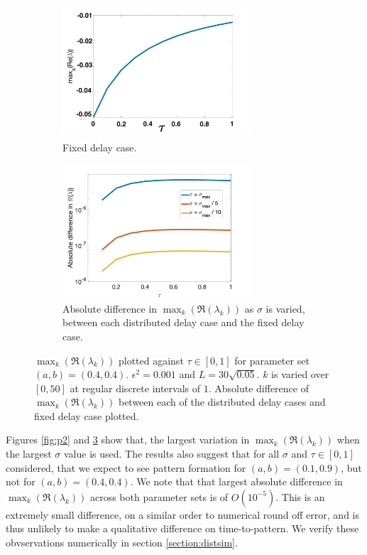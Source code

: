 \begin{figure}[H]
    \centering
    \begin{subfigure}[b]{0.45\textwidth}
        \centering
        \includegraphics[width=7cm,height=5cm]{p3fixed.png}
        \caption{Fixed delay case.}
        \label{}
    \end{subfigure}
    \hfill
    \begin{subfigure}[b]{0.45\textwidth}
        \centering
        \includegraphics[width=7cm,height=5cm]{dispdiff2.png}
        \caption{Absolute difference in $\max_k(\Re(\lambda_k))$ as $\sigma$ is varied, between each distributed delay case and the fixed delay case.}
        \label{}
    \end{subfigure}
    \caption{$\max_k(\Re(\lambda_k))$ plotted against $\tau\in[0,1]$ for parameter set $(a,b)=(0.4,0.4)$. $\epsilon^2=0.001$ and $L=30\sqrt{0.05}$. $k$ is varied over $[0,50]$ at regular discrete intervals of $1$. Absolute difference of $\max_k(\Re(\lambda_k))$ between each of the distributed delay cases and fixed delay case plotted.}
    \label{fig:p3}
\end{figure}

Figures \ref{fig:p2} and \ref{fig:p3} show that, the largest variation in $\max_k(\Re(\lambda_k))$ when the largest $\sigma$ value is used. The results also suggest that for all $\sigma$ and $\tau\in[0,1]$ considered, that we expect to see pattern formation for $(a,b)=(0.1,0.9)$, but not for $(a,b)=(0.4,0.4)$. We note that that largest absolute difference in $\max_k(\Re(\lambda_k))$ across both parameter sets is of $O(10^{-5})$. This is an extremely small difference, on a similar order to numerical round off error, and is thus unlikely to make a qualitative difference on time-to-pattern. We verify these obvservations numerically in section \ref{section:distsim}.

